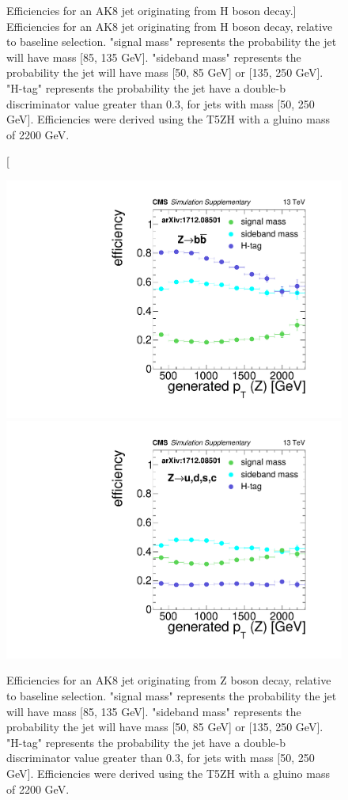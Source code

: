 \begin{figure}
\caption
[Efficiencies for an AK8 jet originating from H boson decay.]
{Efficiencies for an AK8 jet originating from H boson decay, relative to baseline selection. "signal mass" represents the probability the jet will have mass [85, 135 GeV]. "sideband mass" represents the probability the jet will have mass [50, 85 GeV] or [135, 250 GeV]. "H-tag" represents the probability the jet have a double-b discriminator value greater than 0.3, for jets with mass [50, 250 GeV]. Efficiencies were derived using the T5ZH  with a gluino mass of 2200 GeV. }
\label{fig:effH}
\end{figure}

\begin{figure}
\centering
\includegraphics[width=0.425\linewidth]{figs/CMS-SUS-17-006_Figure-aux_011.pdf}
\includegraphics[width=0.425\linewidth]{figs/CMS-SUS-17-006_Figure-aux_012.pdf}
\caption[Efficiencies for an AK8 jet originating from Z boson decay.]
{Efficiencies for an AK8 jet originating from Z boson decay, relative to baseline selection. "signal mass" represents the probability the jet will have mass  [85, 135 GeV]. "sideband mass" represents the probability the jet will have mass [50, 85 GeV] or [135, 250 GeV]. "H-tag" represents the probability the jet have a double-b discriminator value greater than 0.3, for jets with mass [50, 250 GeV]. Efficiencies were derived using the T5ZH  with a gluino mass of 2200 GeV.
}
\label{fig:effZ}
\end{figure}

